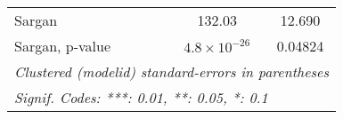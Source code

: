 \begin{table}[htbp]
\begin{tabular}{lcccc}
      Sargan                                     &                 &                        & 132.03                 & 12.690\\  
      Sargan, p-value                            &                 &                        & $4.8\times 10^{-26}$   & 0.04824\\  
      \midrule \midrule
      \multicolumn{5}{l}{\emph{Clustered (modelid) standard-errors in parentheses}}\\
      \multicolumn{5}{l}{\emph{Signif. Codes: ***: 0.01, **: 0.05, *: 0.1}}\\
   \end{tabular}
\end{table}



